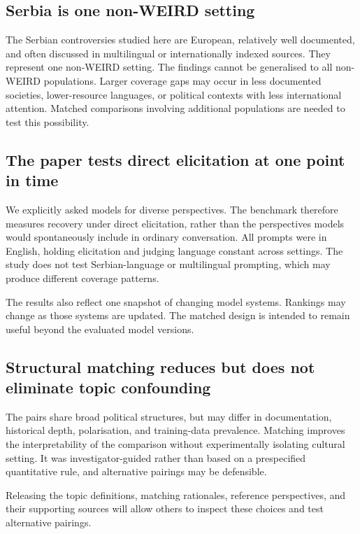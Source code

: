 \documentclass[11pt,a4paper]{article}
\begin{document}
\subsection{Serbia is one non-WEIRD setting}
\label{sec:Serbia is one non-WEIRD case}
The Serbian controversies studied here are European, relatively well documented, and often discussed in multilingual or internationally indexed sources. They represent one non-WEIRD setting. The findings cannot be generalised to all non-WEIRD populations. Larger coverage gaps may occur in less documented societies, lower-resource languages, or political contexts with less international attention. Matched comparisons involving additional populations are needed to test this possibility.

\subsection{The paper tests direct elicitation at one point in time}
\label{sec:The paper tests direct elicitation in a single model snapshot}
We explicitly asked models for diverse perspectives. The benchmark therefore measures recovery under direct elicitation, rather than the perspectives models would spontaneously include in ordinary conversation. All prompts were in English, holding elicitation and judging language constant across settings. The study does not test Serbian-language or multilingual prompting, which may produce different coverage patterns.

The results also reflect one snapshot of changing model systems. Rankings may change as those systems are updated. The matched design is intended to remain useful beyond the evaluated model versions.

\subsection{Structural matching reduces but does not eliminate topic confounding}
\label{sec:Structural matching reduces but does not eliminate topic confounding}
The pairs share broad political structures, but may differ in documentation, historical depth, polarisation, and training-data prevalence. Matching improves the interpretability of the comparison without experimentally isolating cultural setting. It was investigator-guided rather than based on a prespecified quantitative rule, and alternative pairings may be defensible.

Releasing the topic definitions, matching rationales, reference perspectives, and their supporting sources will allow others to inspect these choices and test alternative pairings.
\end{document}
